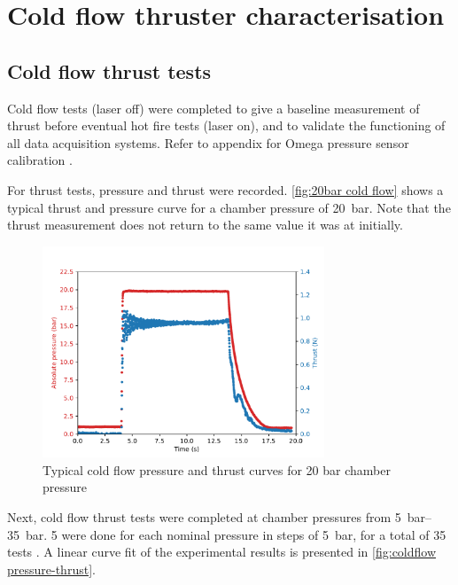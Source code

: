     \section{Cold flow thruster characterisation}

        \subsection{Cold flow thrust tests}

            Cold flow tests (laser off) were completed to give a baseline measurement of thrust before eventual hot fire tests (laser on), and to validate the functioning of all data acquisition systems. Refer to appendix for Omega pressure sensor calibration .

            For thrust tests, pressure and thrust were recorded. \autoref{fig:20bar cold flow} shows a typical thrust and pressure curve for a chamber pressure of \qty{20}{bar}. Note that the thrust measurement does not return to the same value it was at initially.

            \begin{figure}[!ht]
                \centering
                \includegraphics[width=0.75\textwidth]{assets/4 experiments/Example thrust 20 bar.pdf}
                \caption{Typical cold flow pressure and thrust curves for 20 bar chamber pressure}
                \label{fig:20bar cold flow}
            \end{figure}

            Next, cold flow thrust tests were completed at chamber pressures from \qtyrange{5}{35}{bar}. 5 were done for each nominal pressure in steps of \qty{5}{bar}, for a total of 35 tests . A linear curve fit of the experimental results is presented in \autoref{fig:coldflow pressure-thrust}.

